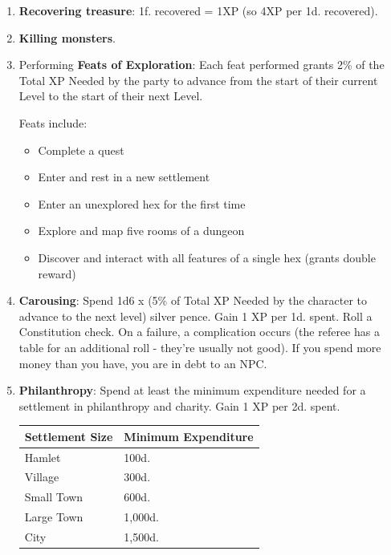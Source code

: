 \documentclass{book}
\providecommand{\tightlist}{%
\setlength{\itemsep}{0pt}\setlength{\parskip}{0pt}}
\begin{document}
\begin{enumerate}
\def\labelenumi{\arabic{enumi}.}
\tightlist
\item
  \textbf{Recovering treasure}: 1f.
  recovered = 1XP (so 4XP per 1d. recovered).
\item
  \textbf{Killing monsters}.
\item
  Performing \textbf{Feats of Exploration}: 
  Each feat performed grants 2\% of the Total XP Needed by the party to
  advance from the start of their current Level to the start of their next
  Level.
  
  Feats include:
  
  \begin{itemize}
  	\tightlist
  	\item
  	Complete a quest
  	\item
  	Enter and rest in a new settlement
  	\item
  	Enter an unexplored hex for the first time
  	\item
  	Explore and map five rooms of a dungeon
  	\item
  	Discover and interact with all features of a single hex (grants double
  	reward)
  \end{itemize}
\item
	\textbf{Carousing}: Spend 1d6 x (5\% of Total XP Needed by the character to advance to the next level) silver pence. Gain 1 XP per 1d. spent. Roll a Constitution check. On a failure, a complication occurs (the referee has a table for an additional roll - they're usually not good). If you spend more money than you have, you are in debt to an NPC.
\newpage
\item
	\textbf{Philanthropy}: Spend at least the minimum expenditure needed for a settlement in philanthropy and charity. Gain 1 XP per 2d. spent.
	
	\begin{table}[H]
		\centering
		\begin{tabular}{ll}
			\toprule
			Settlement Size & Minimum Expenditure \\
			\midrule
			Hamlet & 100d.\\
			Village & 300d.\\
			Small Town & 600d.\\
			Large Town & 1,000d.\\
			City & 1,500d.\\
			\bottomrule
		\end{tabular}
	\end{table}
	

\end{enumerate}
\end{document}
